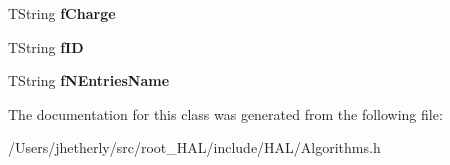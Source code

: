 \begin{DoxyCompactItemize}
\item 
\hypertarget{class_h_a_l_1_1internal_1_1_import_particle_algo_a432b2f29c9b6478353a3964769de7856}{T\-String {\bfseries f\-Charge}}\label{class_h_a_l_1_1internal_1_1_import_particle_algo_a432b2f29c9b6478353a3964769de7856}

\item 
\hypertarget{class_h_a_l_1_1internal_1_1_import_particle_algo_aa6da36afce3530af68e6f4c23ad6012c}{T\-String {\bfseries f\-I\-D}}\label{class_h_a_l_1_1internal_1_1_import_particle_algo_aa6da36afce3530af68e6f4c23ad6012c}

\item 
\hypertarget{class_h_a_l_1_1internal_1_1_import_particle_algo_afc190ea96cc5861855e33e6af6ae1220}{T\-String {\bfseries f\-N\-Entries\-Name}}\label{class_h_a_l_1_1internal_1_1_import_particle_algo_afc190ea96cc5861855e33e6af6ae1220}

\end{DoxyCompactItemize}


The documentation for this class was generated from the following file\-:\begin{DoxyCompactItemize}
\item 
/\-Users/jhetherly/src/root\-\_\-\-H\-A\-L/include/\-H\-A\-L/Algorithms.\-h\end{DoxyCompactItemize}
